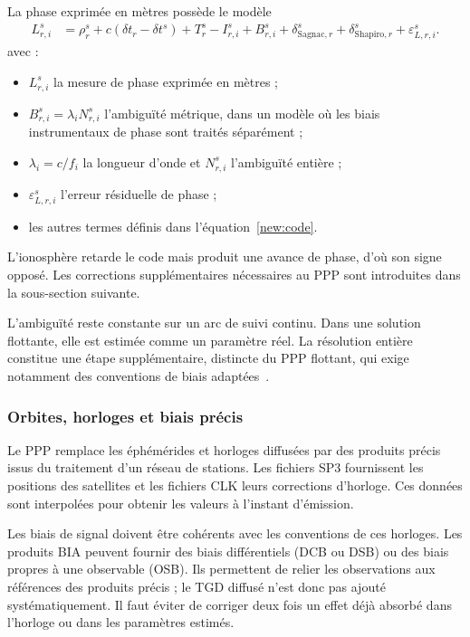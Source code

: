 La phase exprimée en mètres possède le modèle
\begin{align}
L_{r,i}^s&=\rho_r^s+c(\delta t_r-\delta t^s)+T_r^s-I_{r,i}^s
+B_{r,i}^s+\delta_{\mathrm{Sagnac},r}^s+
\delta_{\mathrm{Shapiro},r}^s+\varepsilon_{L,r,i}^s.
\label{new:phase}
\end{align}
avec :
\begin{itemize}
\item $L_{r,i}^s$ la mesure de phase exprimée en mètres ;
\item $B_{r,i}^s=\lambda_iN_{r,i}^s$ l'ambiguïté métrique, dans un modèle
où les biais instrumentaux de phase sont traités séparément ;
\item $\lambda_i=c/f_i$ la longueur d'onde et $N_{r,i}^s$ l'ambiguïté entière ;
\item $\varepsilon_{L,r,i}^s$ l'erreur résiduelle de phase ;
\item les autres termes définis dans l'équation~\eqref{new:code}.
\end{itemize}

L'ionosphère retarde le code mais produit une avance de phase, d'où son signe
opposé. Les corrections supplémentaires nécessaires au PPP sont introduites
dans la sous-section suivante.

L'ambiguïté reste constante sur un arc de suivi continu. Dans une solution
flottante, elle est estimée comme un paramètre réel. La résolution entière
constitue une étape supplémentaire, distincte du PPP flottant, qui exige
notamment des conventions de biais adaptées~\cite{teunissen2017ambiguity}.

\subsubsection{Orbites, horloges et biais précis}

Le PPP remplace les éphémérides et horloges diffusées par des produits précis
issus du traitement d'un réseau de stations. Les fichiers SP3 fournissent les
positions des satellites et les fichiers CLK leurs corrections d'horloge.
Ces données sont interpolées pour obtenir les valeurs à l'instant d'émission.

Les biais de signal doivent être cohérents avec les conventions de ces
horloges. Les produits BIA peuvent fournir des biais différentiels (DCB ou DSB)
ou des biais propres à une observable (OSB). Ils permettent de relier les
observations aux références des produits précis ; le TGD diffusé n'est donc
pas ajouté systématiquement. Il faut éviter de corriger deux fois un effet
déjà absorbé dans l'horloge ou dans les paramètres estimés.

